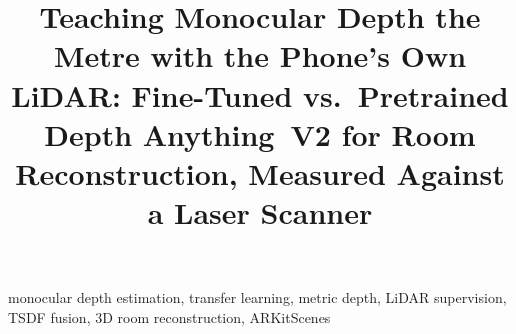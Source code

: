 \documentclass[conference]{IEEEtran}
\begin{document}
\title{Teaching Monocular Depth the Metre with the Phone's Own LiDAR:
Fine-Tuned vs.\ Pretrained Depth Anything~V2 for Room Reconstruction, Measured Against a Laser Scanner}

\author{
}

\maketitle




\begin{IEEEkeywords}
monocular depth estimation, transfer learning, metric depth, LiDAR supervision, TSDF fusion, 3D room reconstruction, ARKitScenes
\end{IEEEkeywords}









\end{document}
